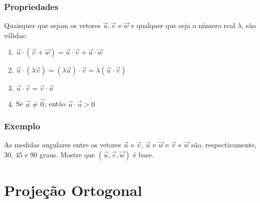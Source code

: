 \documentclass[hyperref={pdfpagelabels=false}]{beamer}
\begin{document}
\begin{frame}
	\frametitle{Propriedades}
	
	Quaisquer que sejam os vetores $\overrightarrow{u}, \overrightarrow{v}$ e $\overrightarrow{w}$ e qualquer que seja o número real $\lambda$, são válidas:
	\begin{enumerate}
		\item $\overrightarrow{u}\cdot(\overrightarrow{v}+\overrightarrow{w}) = \overrightarrow{u}\cdot\overrightarrow{v} + \overrightarrow{u}\cdot\overrightarrow{w}$
		\item $\overrightarrow{u}\cdot(\lambda\overrightarrow{v}) = (\lambda\overrightarrow{u})\cdot\overrightarrow{v} = \lambda(\overrightarrow{u}\cdot\overrightarrow{v})$
		\item $\overrightarrow{u}\cdot\overrightarrow{v} = \overrightarrow{v}\cdot\overrightarrow{u}$
		\item Se $\overrightarrow{u}\neq\overrightarrow{0}$, então $\overrightarrow{u}\cdot\overrightarrow{u} > 0$
	\end{enumerate}
	
\end{frame}

\begin{frame}
	\frametitle{Exemplo}
	
	As medidas angulares entre os vetores $\overrightarrow{u}$ e $\overrightarrow{v}$, $\overrightarrow{u}$ e $\overrightarrow{w}$ e $\overrightarrow{v}$ e $\overrightarrow{w}$ são, respectivamente, $30$, $45$ e $90$ graus. Mostre que $(\overrightarrow{u}, \overrightarrow{v}, \overrightarrow{w})$ é base.
\end{frame}

\section{Projeção Ortogonal}
\end{document}
